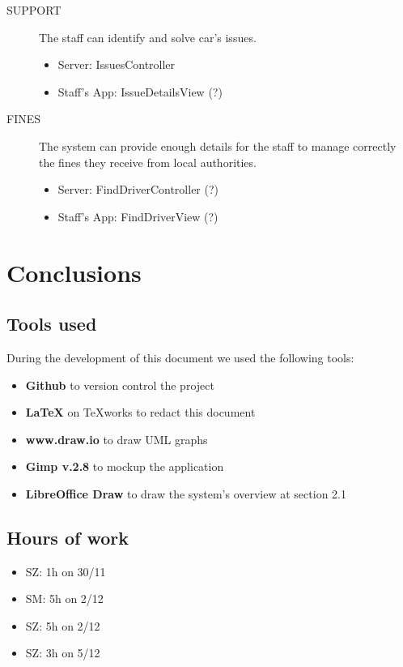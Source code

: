 \documentclass[11pt]{article} %
\begin{document}
\begin{description}
	\item[SUPPORT] The staff can identify and solve car's issues.
	\begin{itemize}
		\item Server: IssuesController
		\item Staff's App: IssueDetailsView (?)
	\end{itemize}

	\item[FINES] The system can provide enough details for the staff to manage correctly the fines they receive from local authorities.
	\begin{itemize}
		\item Server: FindDriverController (?)
		\item Staff's App: FindDriverView (?)
	\end{itemize}

 \end{description}


\newpage
\section{Conclusions}

\subsection{Tools used}
During the development of this document we used the following tools:
\begin{itemize}
	\item \textbf{Github} to version control the project
	\item \textbf{\LaTeX} on TeXworks to redact this document
	\item \textbf{www.draw.io} to draw UML graphs
	\item \textbf{Gimp v.2.8} to mockup the application
	\item \textbf{LibreOffice Draw} to draw the system's overview at section 2.1
\end{itemize}

\subsection{Hours of work}
\begin{itemize}
	\item SZ: 1h on 30/11
	\item SM: 5h on 2/12
	\item SZ: 5h on 2/12
	\item SZ: 3h on 5/12
\end{itemize}
\end{document}
